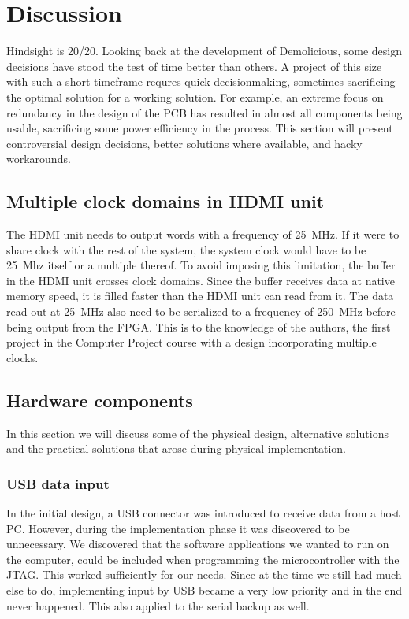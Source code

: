 \documentclass[../main/report.tex]{subfiles}
\begin{document}
\chapter{Discussion}

Hindsight is 20/20.
Looking back at the development of Demolicious, some design decisions have stood the test of time better than others.
A project of this size with such a short timeframe requres quick decisionmaking, sometimes sacrificing the optimal solution for a working solution.
For example, an extreme focus on redundancy in the design of the PCB has resulted in almost all components being usable, sacrificing some power efficiency in the process.
This section will present controversial design decisions, better solutions where available, and hacky workarounds.







\section{Multiple clock domains in HDMI unit}
The HDMI unit needs to output words with a frequency of \SI{25}{MHz}.
If it were to share clock with the rest of the system, the system clock would have to be \SI{25}{Mhz} itself or a multiple thereof.
To avoid imposing this limitation, the buffer in the HDMI unit crosses clock domains.
Since the buffer receives data at native memory speed, it is filled faster than the HDMI unit can read from it.
The data read out at \SI{25}{MHz} also need to be serialized to a frequency of \SI{250}{MHz} before being output from the FPGA.
This is to the knowledge of the authors, the first project in the Computer Project course with a design incorporating multiple clocks.



\section{Hardware components}
In this section we will discuss some of the physical design, alternative solutions and the practical solutions that arose during physical implementation.

\subsection*{USB data input}
In the initial design, a USB connector was introduced to receive data from a host PC. 
However, during the implementation phase it was discovered to be unnecessary.
We discovered that the software applications we wanted to run on the computer, could be included when programming the microcontroller with the JTAG.
This worked sufficiently for our needs. 
Since at the time we still had much else to do, implementing input by USB became a very low priority and in the end never happened.
This also applied to the serial backup as well.
\end{document}
